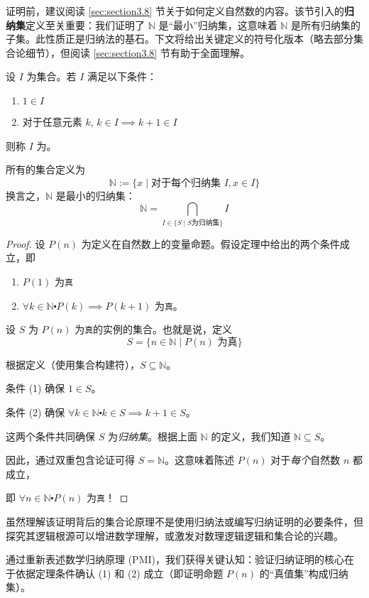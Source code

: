 证明前，建议阅读 \ref{sec:section3.8} 节关于如何定义自然数的内容。该节引入的\textbf{归纳集}定义至关重要：我们证明了 $\mathbb{N}$ 是``最小''归纳集，这意味着 $\mathbb{N}$ 是所有归纳集的子集。此性质正是归纳法的基石。下文将给出关键定义的符号化版本（略去部分集合论细节），但阅读 \ref{sec:section3.8} 节有助于全面理解。

\begin{definition}
    设 $I$ 为集合。若 $I$ 满足以下条件：
    \begin{enumerate}
        \item $1 \in I$
        \item 对于任意元素 $k$, $k \in I \implies k + 1 \in I$
    \end{enumerate}
    则称 $I$ 为。
\end{definition}

\begin{definition}
    所有的集合定义为
    \[\mathbb{N}:=\{x \mid \text{对于每个归纳集\ }I, x \in I\}\]
    换言之，$\mathbb{N}$ 是最小的归纳集：
    \[\mathbb{N} = \bigcap_{I \in \{S \mid S \text{为归纳集}\}} I\] 
\end{definition}

\begin{proof}
    设 $P(n)$ 为定义在自然数上的变量命题。假设定理中给出的两个条件成立，即
    \begin{enumerate}[label=(\arabic*)]
        \item $P(1)$ 为\verb|真|
        \item $\forall k \in \mathbb{N} \centerdot P(k) \implies P(k+1)$ 为\verb|真|。
    \end{enumerate}

    设 $S$ 为 $P(n)$ 为\verb|真|的实例的集合。也就是说，定义
    \[S = \{n \in \mathbb{N} \mid P(n) \text{\ 为真}\}\]

    根据定义（使用集合构建符），$S \subseteq \mathbb{N}$。

    条件 (1) 确保 $1 \in S$。

    条件 (2) 确保 $\forall k \in \mathbb{N} \centerdot k \in S \implies k+1 \in S$。

    这两个条件共同确保 $S$ 为\emph{归纳集}。根据上面 $\mathbb{N}$ 的定义，我们知道 $\mathbb{N} \subseteq S$。

    因此，通过双重包含论证可得 $S = \mathbb{N}$。这意味着陈述 $P(n)$ 对于\emph{每个}自然数 $n$ 都成立，
    
    即 $\forall n \in \mathbb{N} \centerdot P(n)$ 为\verb|真|！
\end{proof}

虽然理解该证明背后的集合论原理不是使用归纳法或编写归纳证明的必要条件，但探究其逻辑根源可以增进数学理解，或激发对数理逻辑逻辑和集合论的兴趣。

通过重新表述数学归纳原理 (PMI)，我们获得关键认知：验证归纳证明的核心在于依据定理条件确认 (1) 和 (2) 成立（即证明命题 $P(n)$ 的``真值集''构成归纳集）。
